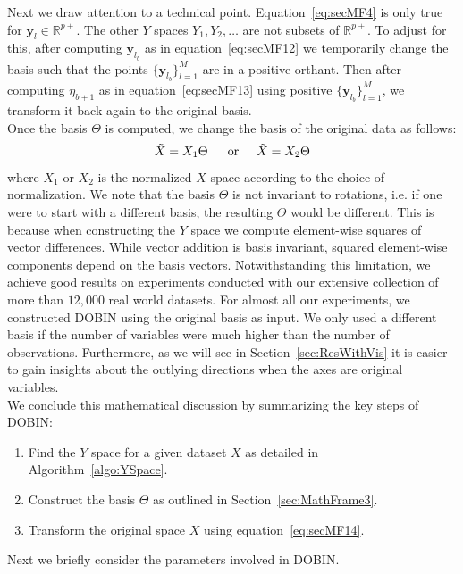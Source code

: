 \documentclass[11pt]{article}
\begin{document}
Next we draw attention to a technical point. Equation~\ref{eq:secMF4} is only true for  $\bm{y}_l \in \mathbb{R}^{p+}$. The other $Y$ spaces $Y_1, Y_2, \ldots $ are not  subsets of $\mathbb{R}^{p+}$. To adjust for this, after computing  $\bm{y}_{l_{b}}$ as in equation~\eqref{eq:secMF12} we temporarily change the basis such that the points  $\{ \bm{y}_{l_{b}}\}_{l=1}^M$ are in a positive orthant.  Then after computing  $\eta_{b+1}$ as in equation~\eqref{eq:secMF13} using positive $\{ \bm{y}_{l_{b}}\}_{l=1}^M$,  we transform it back again to the original basis.  \\

\noindent
Once the basis $\Theta$  is computed, we  change the basis of the original data as follows:
\begin{equation}\label{eq:secMF14}
    \tilde{X} = X_1 \Theta \,  \hspace{0.5cm}  \text{or}  \hspace{0.5cm}   \tilde{X} = X_2 \Theta
\end{equation}
where $X_1$ or $X_2$ is the normalized $X$ space according to the choice of normalization. We note that the basis $\Theta$ is not invariant to rotations, i.e. if one were to start with a different basis, the resulting $\Theta$ would be different. This is because when constructing the $Y$ space we compute element-wise squares of vector differences. While vector addition is basis invariant, squared element-wise components depend on the basis vectors. Notwithstanding this limitation, we achieve good results on experiments conducted with our extensive collection of more than $12,000$ real world datasets. For almost all our experiments, we constructed DOBIN using the original basis as input. We only used a different basis if the number of variables  were much higher than the number of observations.  %
Furthermore, as we will see in Section~\ref{sec:ResWithVis} it is easier to gain insights about the outlying directions when the axes are original variables. \\

\noindent
We conclude this mathematical discussion by summarizing the key steps of DOBIN:
\begin{enumerate}
    \item Find the $Y$ space for a given dataset $X$ as detailed in Algorithm~\ref{algo:YSpace}.
    \item Construct the basis $\Theta$ as outlined in Section~\ref{sec:MathFrame3}. 
    \item Transform the original space $X$ using equation~\eqref{eq:secMF14}.
\end{enumerate}
Next we briefly consider the parameters involved in DOBIN. 
\end{document}
